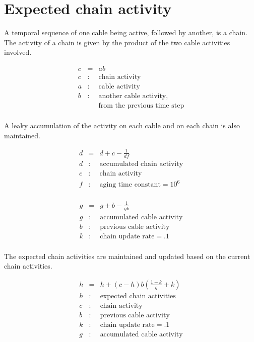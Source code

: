 \documentclass[oneside,twocolumn]{article}
\begin{document}
\section*{\color{copper} Expected chain activity}

A temporal sequence of one cable being active, followed by another, is a chain. The activity of a chain is given by the product of the two cable activities involved.

\begin{eqnarray*}
c &= & ab\\ 
c &:& \mbox{chain activity} \\
a &:& \mbox{cable activity} \\
b &:& \mbox{another cable activity,}\\
&& \mbox{from the previous time step}\\
\end{eqnarray*}

A leaky accumulation of the activity on each cable and on each chain is also maintained.

\begin{eqnarray*}
d &= & d + c - \frac{1}{df}\\ 
d &:& \mbox{accumulated chain activity} \\
c &:& \mbox{chain activity} \\
f &:& \mbox{aging time constant} = 10^6 \\
\end{eqnarray*}

\begin{eqnarray*}
g &= & g + b - \frac{1}{gk}\\ 
g &:& \mbox{accumulated cable activity} \\
b &:& \mbox{previous cable activity} \\
k &:& \mbox{chain update rate} = .1 \\
\end{eqnarray*}

The expected chain activities are maintained and updated based on the current chain activities. 

\begin{eqnarray*}
h &= & h + (c-h)b \left ( \frac{1 - k}{g} + k \right)\\ 
h &:& \mbox{expected chain activities} \\
c &:& \mbox{chain activity} \\
b &:& \mbox{previous cable activity} \\
k &:& \mbox{chain update rate} = .1 \\
g &:& \mbox{accumulated cable activity} \\
\end{eqnarray*}
\end{document}
